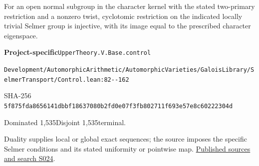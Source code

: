 
\begin{formalstatement}[D558]\label{decomp:D558}
For an open normal subgroup in the character kernel with the stated two-primary restriction and a nonzero twist, cyclotomic restriction on the indicated locally trivial Selmer group is injective, with its image equal to the prescribed character eigenspace.
\end{formalstatement}
{\small\raggedright\noindent\textsf{\bfseries Project-specific}\quad \nolinkurl{UpperTheory.V.Base.control}\par\noindent \nolinkurl{Development/AutomorphicArithmetic/AutomorphicVarieties/GaloisLibrary/SelmerTransport/Control.lean:82--162}\par\noindent SHA-256 \nolinkurl{5f875fda8656141dbbf18637080b2fd0e07f3fb802711f693e57e8c60222304d}\par\noindent Dominated 1,535\quad Disjoint 1,535\quad terminal.\par}
Duality supplies local or global exact sequences; the source imposes the specific Selmer conditions and its stated uniformity or pointwise map.
\hyperref[lit:S024]{Published sources and search S024}.
